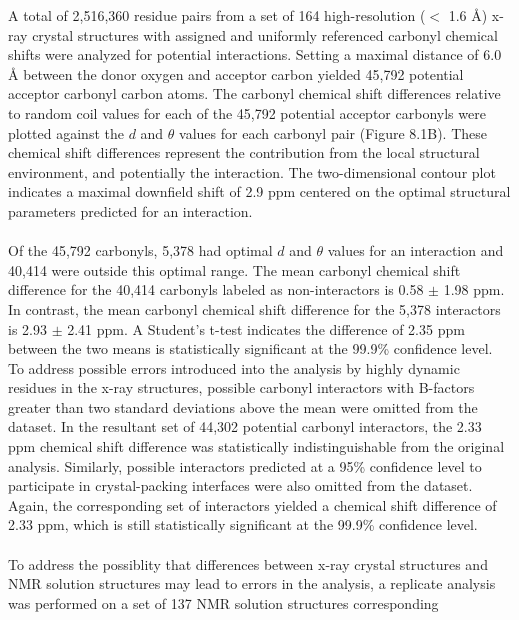 \begin{doublespace}
A total of 2,516,360 residue pairs from a set of 164 high-resolution
($<$ 1.6 \r{A}) x-ray crystal structures with assigned and uniformly referenced
carbonyl \cnmr{} chemical shifts were analyzed for potential \npistar{}
interactions. Setting a maximal distance of 6.0 \r{A} between the donor oxygen
and acceptor carbon yielded 45,792 potential acceptor carbonyl carbon atoms.
The carbonyl \cnmr{} chemical shift differences relative to random coil values
for each of the 45,792 potential acceptor carbonyls were plotted against the
$d$ and $\theta$ values for each carbonyl pair (Figure 8.1B). These chemical
shift differences represent the contribution from the local structural
environment, and potentially the \npistar{} interaction. The two-dimensional
contour plot indicates a maximal downfield shift of 2.9 ppm centered on the
optimal structural parameters predicted for an \npistar{} interaction.
\\\\
Of the 45,792 carbonyls, 5,378 had optimal $d$ and $\theta$ values for an
\npistar{} interaction and 40,414 were outside this optimal range. The mean
carbonyl \cnmr{} chemical shift difference for the 40,414 carbonyls labeled as
non-interactors is 0.58 $\pm$ 1.98 ppm. In contrast, the mean carbonyl \cnmr{}
chemical shift difference for the 5,378 interactors is 2.93 $\pm$ 2.41 ppm. A
Student's t-test indicates the difference of 2.35 ppm between the two means is
statistically significant at the 99.9\% confidence level. To address possible
errors introduced into the analysis by highly dynamic residues in the x-ray
structures, possible carbonyl interactors with B-factors greater than two
standard deviations above the mean were omitted from the dataset. In the
resultant set of 44,302 potential carbonyl interactors, the 2.33 ppm chemical
shift difference was statistically indistinguishable from the original
analysis. Similarly, possible interactors predicted at a 95\% confidence level
to participate in crystal-packing interfaces were also omitted from the
dataset. Again, the corresponding set of interactors yielded a chemical shift
difference of 2.33 ppm, which is still statistically significant at the 99.9\%
confidence level.
\\\\
To address the possiblity that differences between x-ray crystal structures
and NMR solution structures may lead to errors in the analysis, a replicate
analysis was performed on a set of 137 NMR solution structures corresponding

\end{doublespace}
